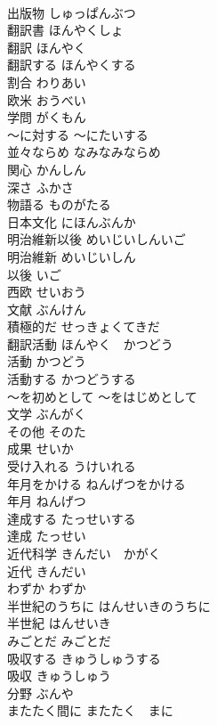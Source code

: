 \documentclass[8pt]{extreport}
\begin{document}
\begin{CJK}{UTF8}{min}
\\	出版物	しゅっぱんぶつ	
\\	翻訳書	ほんやくしょ	
\\	翻訳	ほんやく	
\\	翻訳する	ほんやくする	
\\	割合	わりあい	
\\	欧米	おうべい	
\\	学問	がくもん	
\\	〜に対する	〜にたいする	
\\	並々ならめ	なみなみならめ	
\\	関心	かんしん	
\\	深さ	ふかさ	
\\	物語る	ものがたる	
\\	日本文化	にほんぶんか	
\\	明治維新以後	めいじいしんいご	
\\	明治維新	めいじいしん	
\\	以後	いご	
\\	西欧	せいおう	
\\	文献	ぶんけん	
\\	積極的だ	せっきょくてきだ	
\\	翻訳活動	ほんやく　かつどう	
\\	活動	かつどう	
\\	活動する	かつどうする	
\\	〜を初めとして	〜をはじめとして	
\\	文学	ぶんがく	
\\	その他	そのた	
\\	成果	せいか	
\\	受け入れる	うけいれる	
\\	年月をかける	ねんげつをかける	
\\	年月	ねんげつ	
\\	達成する	たっせいする	
\\	達成	たっせい	
\\	近代科学	きんだい　かがく	
\\	近代	きんだい	
\\	わずか	わずか	
\\	半世紀のうちに	はんせいきのうちに	
\\	半世紀	はんせいき	
\\	みごとだ	みごとだ	
\\	吸収する	きゅうしゅうする	
\\	吸収	きゅうしゅう	
\\	分野	ぶんや	
\\	またたく間に	またたく　まに	

\end{CJK}
\end{document}
